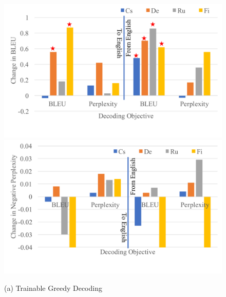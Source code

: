 \begin{figure}[t]
\centering
\begin{minipage}{\textwidth}
\centering

  \begin{minipage}{0.48\columnwidth}
  \centering
  \includegraphics[width=\columnwidth]{figs/trainable/greedy_bleu.pdf}
  \end{minipage}
  \hfill
  \begin{minipage}{0.48\columnwidth}
  \centering
  \includegraphics[width=\columnwidth]{figs/trainable/greedy_perplexity.pdf}
  \end{minipage}
  \label{fig:r1}

  (a) Trainable Greedy Decoding


\end{minipage}
\end{figure}
